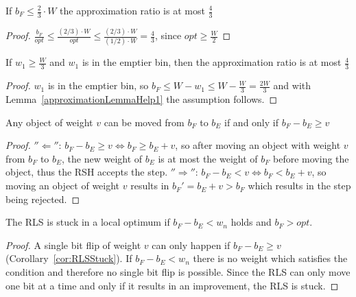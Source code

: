\begin{lemma}\label{approximationLemmaHelp1}
    If \(b_F \le \frac{2}{3} \cdot W\) the approximation ratio is at most $\frac{4}{3}$
\end{lemma}
\begin{proof}
    \(\frac{b_F}{opt} \le \frac{(2/3) \cdot W}{opt} \le \frac{(2/3) \cdot W}{(1/2) \cdot W} = \frac{4}{3}\), since \(opt \ge \frac{W}{2}\)
\end{proof}

\begin{corollary}\label{approximationCorollaryHelp2}
    If \(w_1 \ge \frac{W}{3}\) and \(w_1\) is in the emptier bin, then the approximation ratio is at most $\frac{4}{3}$
\end{corollary}
\begin{proof}
    $w_1$ is in the emptier bin, so \( b_F \le W - w_1 \le W - \frac{W}{3} = \frac{2W}{3} \) and with Lemma~\ref{approximationLemmaHelp1} the assumption follows.
\end{proof}

\begin{lemma}\label{movingObjectsLemma}
    Any object of weight $v$ can be moved from $b_F$ to $b_E$ if and only if \(b_F - b_E \ge v\)
\end{lemma}
\begin{proof}
    $''\Leftarrow''$:\newline
    \(b_F - b_E \ge v \Leftrightarrow b_F \ge b_E + v\), so after moving an object with weight $v$ from $b_F$ to $b_E$, the new weight of $b_E$ is at most the weight of $b_F$ before moving the object, thus the RSH accepts the step.\newline
    $''\Rightarrow''$:\newline
    \(b_F - b_E < v \Leftrightarrow b_F < b_E + v\), so moving an object of weight $v$ results in ${b_F}' = b_E+v > b_F$ which results in the step being rejected.
\end{proof}

\begin{corollary}\label{cor:RLSStuck}
    The RLS is stuck in a local optimum if \(b_F-b_E < w_n\) holds and \(b_F > opt\).
\end{corollary}
\begin{proof}
    A single bit flip of weight $v$ can only happen if \(b_F - b_E \ge v\) (Corollary~\ref{cor:RLSStuck}). If \(b_F-b_E < w_n\) there is no weight which satisfies the condition and therefore no single bit flip is possible.
    Since the RLS can only move one bit at a time and only if it results in an improvement, the RLS is stuck.
\end{proof}

